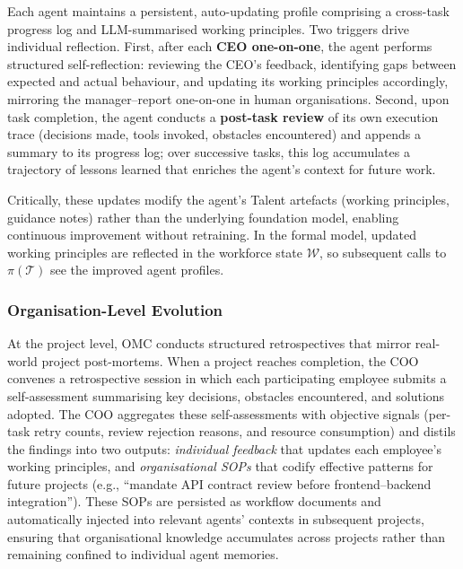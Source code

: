 \documentclass[11pt,a4paper]{article}
\begin{document}
Each agent maintains a persistent, auto-updating profile comprising a cross-task progress log and LLM-summarised working principles.  Two triggers drive individual reflection.  First, after each \textbf{CEO one-on-one}, the agent performs structured self-reflection: reviewing the CEO's feedback, identifying gaps between expected and actual behaviour, and updating its working principles accordingly, mirroring the manager--report one-on-one in human organisations.  Second, upon task completion, the agent conducts a \textbf{post-task review} of its own execution trace (decisions made, tools invoked, obstacles encountered) and appends a summary to its progress log; over successive tasks, this log accumulates a trajectory of lessons learned that enriches the agent's context for future work.

Critically, these updates modify the agent's Talent artefacts (working principles, guidance notes) rather than the underlying foundation model, enabling continuous improvement without retraining.  In the formal model, updated working principles are reflected in the workforce state $\mathcal{W}$, so subsequent calls to $\pi(\mathcal{T})$ see the improved agent profiles.

\subsubsection{Organisation-Level Evolution}

At the project level, OMC conducts structured retrospectives that mirror real-world project post-mortems.  When a project reaches completion, the COO convenes a retrospective session in which each participating employee submits a self-assessment summarising key decisions, obstacles encountered, and solutions adopted.  The COO aggregates these self-assessments with objective signals (per-task retry counts, review rejection reasons, and resource consumption) and distils the findings into two outputs: \emph{individual feedback} that updates each employee's working principles, and \emph{organisational SOPs} that codify effective patterns for future projects (e.g., ``mandate API contract review before frontend--backend integration'').  These SOPs are persisted as workflow documents and automatically injected into relevant agents' contexts in subsequent projects, ensuring that organisational knowledge accumulates across projects rather than remaining confined to individual agent memories.
\end{document}
